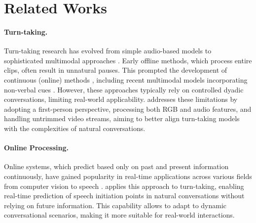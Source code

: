 \section{Related Works}\label{sec:relatedworks}
\paragraph{Turn-taking.}
Turn-taking research has evolved from simple audio-based models \cite{duncan1972some, khouzaimi2015optimising} to sophisticated multimodal approaches \cite{maier2017LSTMtowards, lee2023multimodal, mizuno2023next, kurata2023multimodal}. Early offline methods, which process entire clips, often result in unnatural pauses. This prompted the development of continuous (online) methods \cite{skantze2017towards, ekstedt2022voice, li2022can}, including recent multimodal models incorporating non-verbal cues \cite{onishi2023multimodalvap}. However, these approaches typically rely on controlled dyadic conversations, limiting real-world applicability. 
\frameworkname addresses these limitations by adopting a first-person perspective, processing both RGB and audio features, and handling untrimmed video streams, aiming to better align turn-taking models with the complexities of natural conversations.



\paragraph{Online Processing.}
Online systems, which predict based only on past and present information continuously, have gained popularity in real-time applications across various fields from computer vision to speech \cite{fan2018online, de2016online, kang2021cag, bewley2016simple, rettig2019online, miao2020transformer}.  \frameworkname applies this approach to turn-taking, enabling real-time prediction of speech initiation points in natural conversations without relying on future information. This capability allows \frameworkname to adapt to dynamic conversational scenarios, making it more suitable for real-world interactions.


















 















